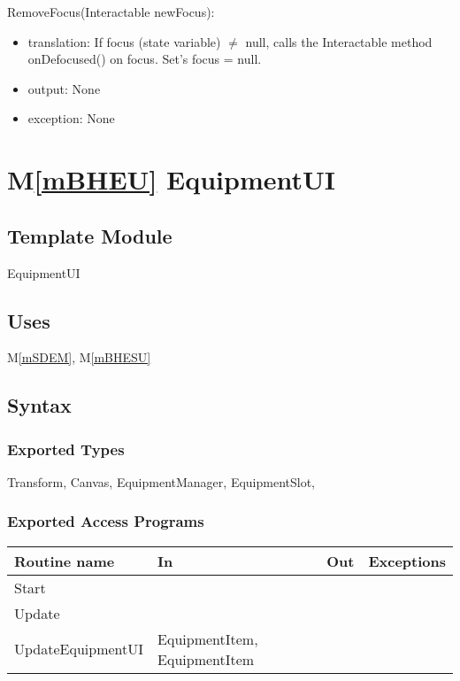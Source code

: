 \documentclass[12pt]{article}
\newcommand{\mref}[1]{M\ref{#1}}
\begin{document}
\noindent RemoveFocus(Interactable newFocus):
\begin{itemize}
\item translation: If focus (state variable) $\neq$ null, calls the Interactable method onDefocused() on focus. Set's focus = null.
\item output: None
\item exception: None
\end{itemize}

\newpage

\section* {\mref{mBHEU} EquipmentUI}

\subsection*{Template Module}

EquipmentUI

\subsection* {Uses}

\mref{mSDEM}, \mref{mBHESU}

\subsection* {Syntax}

\subsubsection* {Exported Types}

Transform, Canvas, EquipmentManager, EquipmentSlot, 

\subsubsection* {Exported Access Programs}

\begin{tabular}{| l | l | l | l |}
\hline
\textbf{Routine name} & \textbf{In} & \textbf{Out} & \textbf{Exceptions}\\
\hline
Start & ~ & ~  & ~\\
Update & ~ & ~ & ~\\
UpdateEquipmentUI & EquipmentItem, EquipmentItem & ~ & ~\\
\hline
\end{tabular}
\end{document}
